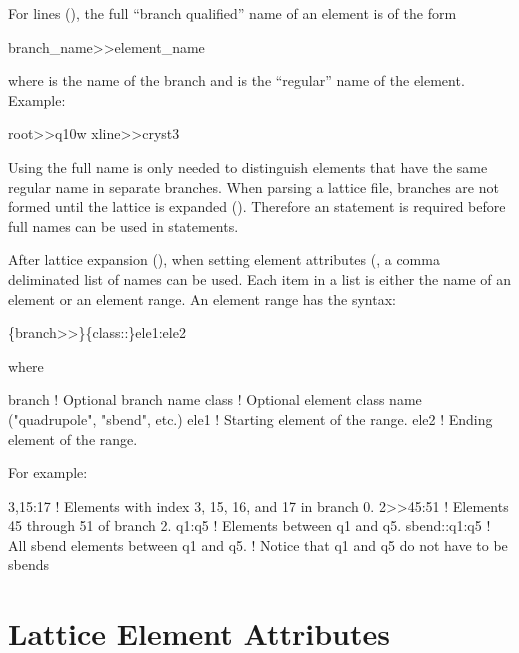 {{{For  lines (), the full ``branch qualified'' name of an element is of
the form
\begin{example}
  branch_name>>element_name
\end{example}
where  is the name of the branch and  is the ``regular'' name of
the element. Example:
\begin{example}
  root>>q10w
  xline>>cryst3
\end{example}
Using the full name is only needed to distinguish elements that have the same regular name in
separate branches. When parsing a lattice file, branches are not formed until the lattice is
expanded (). Therefore an  statement is required before full names
can be used in statements.

After lattice expansion (), when setting element attributes (, a
comma deliminated list of names can be used. Each item in a list is either the name of an element or
an element range. An element range has the syntax:
\begin{example}
  \{branch>>\}\{class::\}ele1:ele2
\end{example}
where
\begin{example}
  branch   ! Optional branch name
  class    ! Optional element class name ("quadrupole", "sbend", etc.)
  ele1     ! Starting element of the range.
  ele2     ! Ending element of the range. 
\end{example}
For example:
\begin{example}
  3,15:17          ! Elements with index 3, 15, 16, and 17 in branch 0.
  2>>45:51         ! Elements 45 through 51 of branch 2.
  q1:q5            ! Elements between q1 and q5.
  sbend::q1:q5     ! All sbend elements between q1 and q5. 
                   ! Notice that q1 and q5 do not have to be sbends
\end{example}

\section{Lattice Element Attributes}
\label{s:lat.attribs}

}}}

